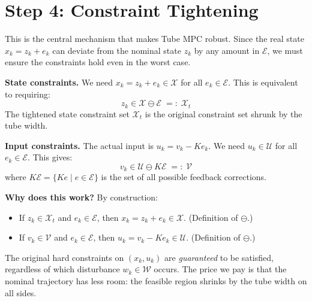\section{Step 4: Constraint Tightening}
\label{sec:constraint_tightening}

This is the central mechanism that makes Tube MPC robust. Since the real state $x_k = z_k + e_k$ can deviate from the nominal state $z_k$ by any amount in $\mathcal{E}$, we must ensure the constraints hold even in the worst case.

\textbf{State constraints.} We need $x_k = z_k + e_k \in \mathcal{X}$ for all $e_k \in \mathcal{E}$. This is equivalent to requiring:
\begin{equation}
	z_k \in \mathcal{X} \ominus \mathcal{E} \;=:\; \mathcal{X}_t
\end{equation}
The tightened state constraint set $\mathcal{X}_t$ is the original constraint set shrunk by the tube width.

\textbf{Input constraints.} The actual input is $u_k = v_k - Ke_k$. We need $u_k \in \mathcal{U}$ for all $e_k \in \mathcal{E}$. This gives:
\begin{equation}
	v_k \in \mathcal{U} \ominus K\mathcal{E} \;=:\; \mathcal{V}
\end{equation}
where $K\mathcal{E} = \{Ke \mid e \in \mathcal{E}\}$ is the set of all possible feedback corrections.

\textbf{Why does this work?} By construction:
\begin{itemize}[noitemsep]
	\item If $z_k \in \mathcal{X}_t$ and $e_k \in \mathcal{E}$, then $x_k = z_k + e_k \in \mathcal{X}$. \hfill (Definition of $\ominus$.)
	\item If $v_k \in \mathcal{V}$ and $e_k \in \mathcal{E}$, then $u_k = v_k - Ke_k \in \mathcal{U}$. \hfill (Definition of $\ominus$.)
\end{itemize}

The original hard constraints on $(x_k, u_k)$ are \emph{guaranteed} to be satisfied, regardless of which disturbance $w_k \in \mathcal{W}$ occurs. The price we pay is that the nominal trajectory has less room: the feasible region shrinks by the tube width on all sides.

